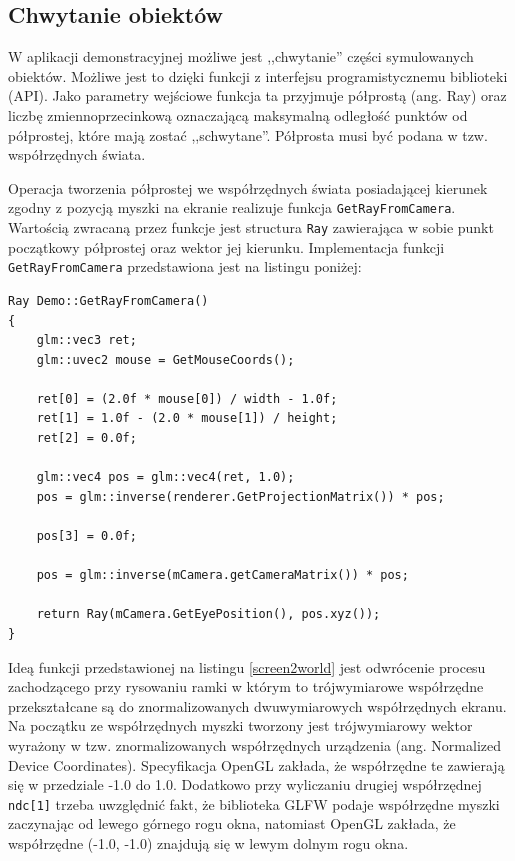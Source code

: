 \subsection{Chwytanie obiektów}
W aplikacji demonstracyjnej możliwe jest ,,chwytanie'' części symulowanych
obiektów. Możliwe jest to dzięki funkcji z interfejsu programistycznemu
biblioteki (API). Jako parametry wejściowe funkcja ta przyjmuje półprostą (ang.
		Ray) oraz liczbę zmiennoprzecinkową oznaczającą maksymalną odległość
punktów od półprostej, które mają zostać ,,schwytane''. Półprosta musi być
podana w tzw. współrzędnych świata.

Operacja tworzenia półprostej we współrzędnych świata posiadającej kierunek
zgodny z pozycją myszki na ekranie realizuje funkcja \texttt{GetRayFromCamera}.
Wartością zwracaną przez funkcje jest structura \texttt{Ray} zawierająca w sobie
punkt początkowy półprostej oraz wektor jej kierunku.
	Implementacja funkcji \texttt{GetRayFromCamera}
	przedstawiona jest na listingu poniżej:

\begin{lstlisting}[caption=Estymacja wektora w przstrzeni trójwymiarowej na
	podstawie pozycji myszki na ekranie, label=screen2world]
Ray Demo::GetRayFromCamera()
{
	glm::vec3 ret;
	glm::uvec2 mouse = GetMouseCoords();

	ret[0] = (2.0f * mouse[0]) / width - 1.0f;
	ret[1] = 1.0f - (2.0 * mouse[1]) / height;
	ret[2] = 0.0f;

	glm::vec4 pos = glm::vec4(ret, 1.0);
	pos = glm::inverse(renderer.GetProjectionMatrix()) * pos;

	pos[3] = 0.0f;

	pos = glm::inverse(mCamera.getCameraMatrix()) * pos;

	return Ray(mCamera.GetEyePosition(), pos.xyz());
}
\end{lstlisting}

Ideą funkcji przedstawionej na listingu \ref{screen2world} jest odwrócenie
procesu zachodzącego przy rysowaniu ramki w którym to trójwymiarowe współrzędne
przekształcane są do znormalizowanych dwuwymiarowych współrzędnych ekranu.
Na początku ze współrzędnych myszki tworzony jest trójwymiarowy wektor
wyrażony w tzw. znormalizowanych współrzędnych urządzenia (ang. Normalized
		Device Coordinates). Specyfikacja OpenGL zakłada, że współrzędne te zawierają się w
przedziale -1.0 do 1.0. Dodatkowo przy wyliczaniu drugiej współrzędnej
\texttt{ndc[1]} trzeba uwzględnić fakt, że biblioteka GLFW podaje współrzędne
myszki zaczynając od lewego górnego rogu okna, natomiast OpenGL zakłada, że
współrzędne (-1.0, -1.0) znajdują się w lewym dolnym rogu okna.

